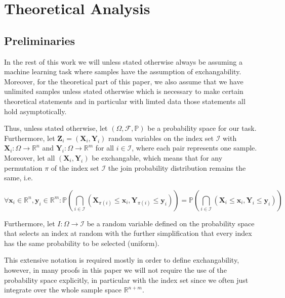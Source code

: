 \chapter{Theoretical Analysis}\label{chap:theoretical}

\section{Preliminaries}\label{sec:preliminaries}

In the rest of this work we will unless stated otherwise always be assuming a machine learning task where samples have the assumption of exchangability. Moreover, for the theoretical part of this paper, we also assume that we have unlimited samples unless stated otherwise which is necessary to make certain theoretical statements and in particular with limted data those statements all hold asymptotically.

Thus, unless stated otherwise, let $\left(\Omega, \mathcal{F}, \mathbb{P}\right)$ be a probability space for our task. Furthermore, let $\mathbf{Z}_i = (\mathbf{X}_i, \mathbf{Y}_i)$ random variables on the index set $\mathcal{I}$ with $\mathbf{X}_i: \Omega \to \mathbb{R}^n$ and $\mathbf{Y}_i: \Omega \to \mathbb{R}^m$ for all $i\in\mathcal{I}$, where each pair represents one sample. Moreover, let all $(\mathbf{X}_i, \mathbf{Y}_i)$ be exchangable, which means that for any permutation $\pi$ of the index set $\mathcal{I}$ the join probability distribution remains the same, i.e.

\begin{equation}
    \forall \mathbf{x}_i \in \mathbb{R}^n, \mathbf{y}_i \in \mathbb{R}^m:
    \mathbb{P}\left( \bigcap_{i\in\mathcal{I}} (\mathbf{X}_{\pi(i)} \leq \mathbf{x}_i,
        \mathbf{Y}_{\pi(i)} \leq \mathbf{y}_i)\right) = \mathbb{P}\left(
    \bigcap_{i\in\mathcal{I}} (\mathbf{X}_{i} \leq \mathbf{x}_i, \mathbf{Y}_{i} \leq
        \mathbf{y}_i)\right)
\end{equation}

Furthermore, let $I: \Omega \to \mathcal{I}$ be a random variable defined on the probability space that selects an index at random with the further simplification that every index has the same probability to be selected (uniform).

This extensive notation is required mostly in order to define exchangability, however, in many proofs in this paper we will not require the use of the probability space explicitly, in particular with the index set since we often just integrate over the whole sample space $\mathbb{R}^{n+m}$.

